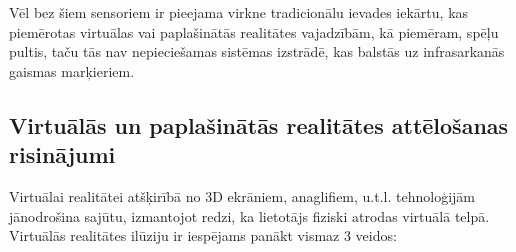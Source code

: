\documentclass[12pt, a4paper, oneside, openright]{article}
\begin{document}
\par
Vēl bez šiem sensoriem ir pieejama virkne tradicionālu ievades iekārtu, kas piemērotas virtuālas
vai paplašinātās realitātes vajadzībām, kā piemēram, spēļu pultis, taču tās nav nepieciešamas 
sistēmas izstrādē, kas balstās uz infrasarkanās gaismas marķieriem.

\newpage
\subsection{Virtuālās un paplašinātās realitātes attēlošanas risinājumi}

\par
Virtuālai realitātei atšķirībā no 3D ekrāniem, anaglifiem, u.t.l. tehnoloģijām
jānodrošina sajūtu, izmantojot redzi, ka lietotājs fiziski atrodas virtuālā telpā.
Virtuālās realitātes ilūziju ir iespējams panākt vismaz 3 veidos:
\end{document}
